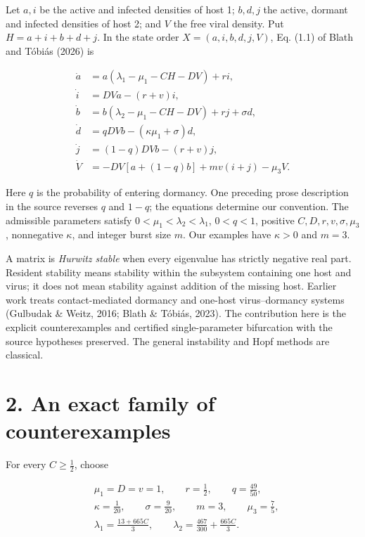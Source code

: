 \documentclass[
  11pt,
]{article}
\begin{document}
Let \(a,i\) be the active and infected densities of host 1; \(b,d,j\)
the active, dormant and infected densities of host 2; and \(V\) the free
viral density. Put \(H=a+i+b+d+j\). In the state order
\(X=(a,i,b,d,j,V)\), Eq. (1.1) of Blath and Tóbiás (2026) is

\[
\begin{aligned}
\dot a&=a(\lambda_1-\mu_1-CH-DV)+ri,\\
\dot i&=DVa-(r+v)i,\\
\dot b&=b(\lambda_2-\mu_1-CH-DV)+rj+\sigma d,\\
\dot d&=qDVb-(\kappa\mu_1+\sigma)d,\\
\dot j&=(1-q)DVb-(r+v)j,\\
\dot V&=-DV[a+(1-q)b]+mv(i+j)-\mu_3V.
\end{aligned} \tag{1.1}
\]

Here \(q\) is the probability of entering dormancy. One preceding prose
description in the source reverses \(q\) and \(1-q\); the equations
determine our convention. The admissible parameters satisfy
\(0<\mu_1<\lambda_2<\lambda_1\), \(0<q<1\), positive
\(C,D,r,v,\sigma,\mu_3\), nonnegative \(\kappa\), and integer burst size
\(m\). Our examples have \(\kappa>0\) and \(m=3\).

A matrix is \emph{Hurwitz stable} when every eigenvalue has strictly
negative real part. Resident stability means stability within the
subsystem containing one host and virus; it does not mean stability
against addition of the missing host. Earlier work treats
contact-mediated dormancy and one-host virus--dormancy systems (Gulbudak
\& Weitz, 2016; Blath \& Tóbiás, 2023). The contribution here is the
explicit counterexamples and certified single-parameter bifurcation with
the source hypotheses preserved. The general instability and Hopf
methods are classical.

\section{2. An exact family of
counterexamples}\label{an-exact-family-of-counterexamples}

For every \(C\geq\tfrac12\), choose

\[
\begin{aligned}
&\mu_1=D=v=1,\qquad r=\frac12,\qquad q=\frac{49}{50},\\
&\kappa=\frac1{20},\qquad \sigma=\frac9{20},\qquad m=3,\qquad\mu_3=\frac75,\\
&\lambda_1=\frac{13+665C}{3},\qquad
\lambda_2=\frac{467}{300}+\frac{665C}{3}.
\end{aligned} \tag{2.1}
\]
\end{document}
